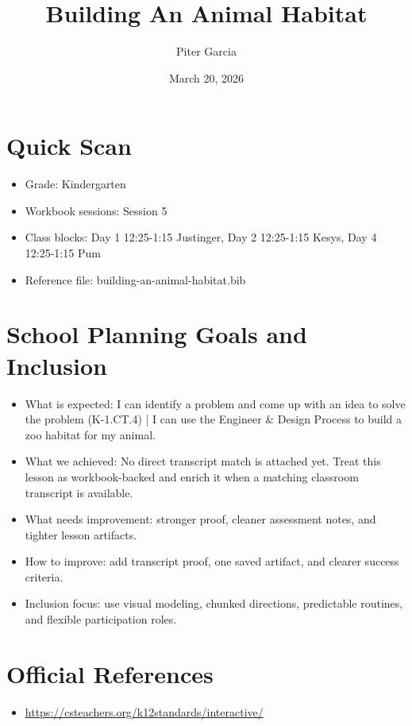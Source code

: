 \documentclass[11pt]{article}
\title{Building An Animal Habitat}
\author{Piter Garcia}
\date{March 20, 2026}
\begin{document}
\maketitle
\section*{Quick Scan}
\begin{itemize}[leftmargin=*]
\item Grade: Kindergarten
\item Workbook sessions: Session 5
\item Class blocks: Day 1 12:25-1:15 Justinger, Day 2 12:25-1:15 Kesys, Day 4 12:25-1:15 Pum
\item Reference file: building-an-animal-habitat.bib
\end{itemize}
\section*{School Planning Goals and Inclusion}
\begin{itemize}[leftmargin=*]
\item What is expected: I can identify a problem and come up with an idea to solve the problem (K-1.CT.4) | I can use the Engineer & Design Process to build a zoo habitat for my animal.
\item What we achieved: No direct transcript match is attached yet. Treat this lesson as workbook-backed and enrich it when a matching classroom transcript is available.
\item What needs improvement: stronger proof, cleaner assessment notes, and tighter lesson artifacts.
\item How to improve: add transcript proof, one saved artifact, and clearer success criteria.
\item Inclusion focus: use visual modeling, chunked directions, predictable routines, and flexible participation roles.
\end{itemize}
\section*{Official References}
\begin{itemize}[leftmargin=*]
\item \url{https://csteachers.org/k12standards/interactive/}

\end{itemize}
\end{document}
